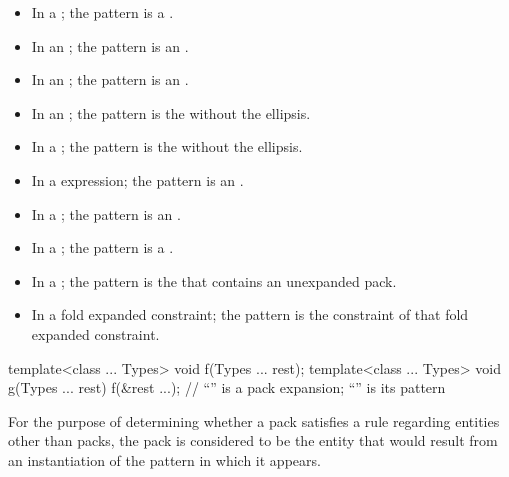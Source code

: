 \begin{itemize}
\item In a ;
the pattern is a .

\item In an ;
the pattern is an .

\item
In an ;
the pattern is an .

\item In an ; the pattern is
the  without the ellipsis.

\item In a ; the pattern is
the  without the ellipsis.

\item In a  expression; the pattern is an
.

\item In a ;
the pattern is an .

\item In a ;
the pattern is a .

\item In a ;
the pattern is the 
that contains an unexpanded pack.

\item In a fold expanded constraint;
the pattern is the constraint of that fold expanded constraint.
\end{itemize}

\begin{example}
\begin{codeblock}
template<class ... Types> void f(Types ... rest);
template<class ... Types> void g(Types ... rest) {
  f(&rest ...);     // ``'' is a pack expansion; ``'' is its pattern
}
\end{codeblock}
\end{example}

\pnum
For the purpose of determining whether a pack satisfies a rule
regarding entities other than packs, the pack is
considered to be the entity that would result from an instantiation of
the pattern in which it appears.

